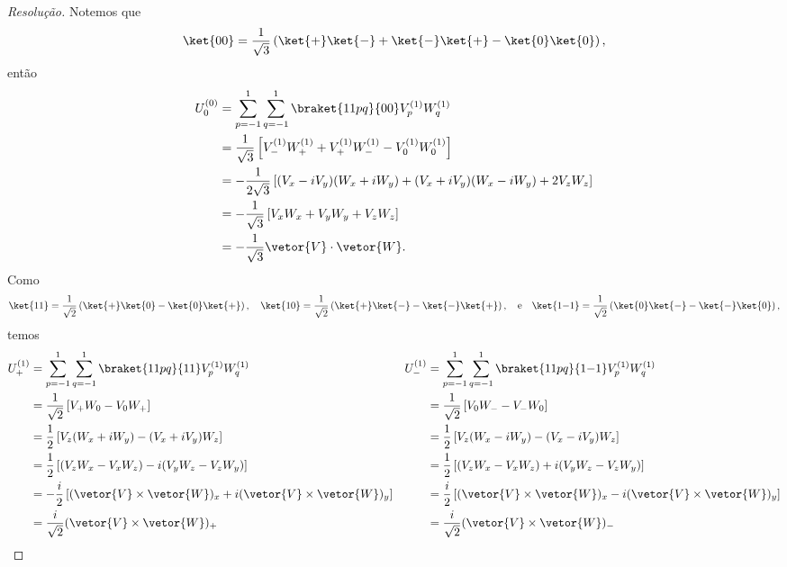 \begin{proof}[Resolução]
   Notemos que
   \begin{equation*}
      \ket{00} = \frac{1}{\sqrt{3}} \left(\ket{+}\ket{-} + \ket{-}\ket{+} - \ket{0}\ket{0}\right),
   \end{equation*}
   então
   \begin{align*}
      U^{(0)}_0 
      &= \sum_{p = -1}^1 \sum_{q = -1}^1 \braket{11pq}{00} V_p^{(1)} W_q^{(1)}\\
      &= \frac1{\sqrt{3}} \left[V^{(1)}_{-} W^{(1)}_{+} + V^{(1)}_{+} W^{(1)}_- - V^{(1)}_0 W^{(1)}_0\right]\\
      &= -\frac{1}{2\sqrt{3}} \left[(V_x - i V_y)(W_x + i W_y) + (V_x + i V_y)(W_x - i W_y) + 2V_z W_z\right]\\
      &= - \frac{1}{\sqrt{3}} \left[V_x W_x + V_y W_y + V_z W_z\right]\\
      &= - \frac{1}{\sqrt{3}} \vetor{V}\cdot \vetor{W}.
   \end{align*}
   Como
   \begin{equation*}
      \ket{11} = \frac{1}{\sqrt{2}} \left(\ket{+}\ket{0} - \ket{0}\ket{+}\right),\quad
      \ket{10} = \frac{1}{\sqrt{2}} \left(\ket{+}\ket{-} - \ket{-}\ket{+}\right),\quad\text{e}\quad
      \ket{1{-1}} = \frac{1}{\sqrt{2}} \left(\ket{0}\ket{-} - \ket{-}\ket{0}\right),
   \end{equation*}
   temos
   \begin{align*}
      U^{(1)}_+ 
      &= \sum_{p = -1}^1 \sum_{q = -1}^1 \braket{11pq}{11} V_p^{(1)} W_q^{(1)}&
      U^{(1)}_-
      &= \sum_{p = -1}^1 \sum_{q = -1}^1 \braket{11pq}{1{-1}} V_p^{(1)} W_q^{(1)}\\
      &= \frac{1}{\sqrt{2}}\left[V_+ W_0 - V_0 W_+\right]&
      &= \frac{1}{\sqrt{2}}\left[V_0 W_- - V_- W_0\right]\\
      &= \frac12 \left[V_z(W_x + i W_y) - (V_x + i V_y) W_z\right]&
      &= \frac12 \left[V_z(W_x - i W_y) - (V_x - i V_y) W_z\right]\\
      &= \frac12 \left[(V_z W_x - V_x W_z) - i (V_y W_z - V_z W_y)\right]&
      &= \frac12 \left[(V_z W_x - V_x W_z) + i (V_y W_z - V_z W_y)\right]\\
      &= -\frac{i}2 \left[(\vetor{V}\times \vetor{W})_x + i(\vetor{V}\times \vetor{W})_y\right]&
      &= \frac{i}{2}\left[(\vetor{V}\times \vetor{W})_x - i(\vetor{V}\times \vetor{W})_y\right]\\
      &= \frac{i}{\sqrt{2}} (\vetor{V}\times \vetor{W})_+&
      &= \frac{i}{\sqrt{2}} (\vetor{V}\times \vetor{W})_-

\end{align*}
\end{proof}

